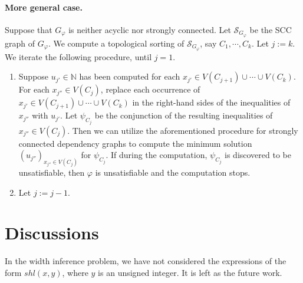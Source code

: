 \documentclass[runningheads]{llncs}
\newcommand\natnum{\mathbb{N}}
\newcommand\intnum{\mathbb{Z}}
\newcommand\sccgraph{\mathcal{S}}
\begin{document}
\paragraph*{More general case.} Suppose that $G_\varphi$ is neither acyclic nor strongly connected. 
Let $\sccgraph_{G_\varphi}$ be the SCC graph of $G_\varphi$. We compute a topological sorting of $\sccgraph_{G_\varphi}$, say $C_1, \cdots, C_k$. Let $j := k$.  We iterate the following procedure, until $j=1$. 
\begin{enumerate}
\item Suppose $u_{j'} \in \natnum$ has been computed for each $x_{j'} \in V(C_{j+1}) \cup \cdots \cup V(C_k)$. For each $x_{j''} \in V(C_j)$, replace each occurrence of $x_{j'} \in V(C_{j+1}) \cup \cdots \cup V(C_k)$ in the right-hand sides of the inequalities of $x_{j''}$ with $u_{j'}$. 
Let $\psi_{C_j}$ be the conjunction of the resulting inequalities of $x_{j''} \in V(C_j)$.
Then we can utilize the aforementioned procedure for strongly connected dependency graphs to compute the minimum solution $(u_{j''})_{x_{j''} \in V(C_j)}$ for $\psi_{C_j}$. If during the computation, $\psi_{C_j}$ is discovered to be unsatisfiable, then $\varphi$ is unsatisfiable and the computation stops. 
%
\item Let $j:=j-1$. 
\end{enumerate}


\section{Discussions}

In the width inference problem, we have not considered the expressions of the form $shl(x, y)$, where $y$ is an unsigned integer. It is left as the future work. 

%

%

\end{document}
